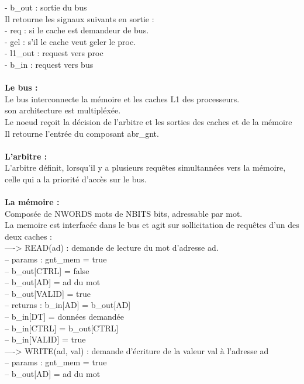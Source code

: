 \documentclass{article}
\begin{document}
- b\_out : sortie du bus\\
Il retourne les signaux suivants en sortie :\\
- req : si le cache est demandeur de bus.\\
- gel : s'il le cache veut geler le proc.\\
- l1\_out : request vers proc\\
- b\_in : request vers bus\\
\\
\textbf{Le bus :}\\
Le bus interconnecte la mémoire et les caches L1 des processeurs.\\
son architecture est multipléxée.\\
Le noeud reçoit la décision de l'arbitre et les sorties des caches et de la mémoire\\
Il retourne l'entrée du composant abr\_gnt.\\
\\
\textbf{L'arbitre :}\\
L'arbitre définit, lorsqu'il y a plusieurs requêtes simultannées vers la mémoire, celle qui a la priorité d'accès sur le bus.\\
\\
\textbf{La mémoire :}\\
Composée de NWORDS mots de NBITS bits, adressable par mot.\\
La memoire est interfacée dans le bus et agit sur sollicitation de requêtes d'un des deux caches : \\
----> READ(ad) : demande de lecture du mot d'adresse ad.\\
--    params   : gnt\_mem      = true\\
--               b\_out[CTRL]  = false\\
--               b\_out[AD]    = ad du mot\\
--               b\_out[VALID] = true\\
--    returns  : b\_in[AD]    = b\_out[AD]\\
--               b\_in[DT]    = données demandée\\
--               b\_in[CTRL]  = b\_out[CTRL]\\
--               b\_in[VALID] = true\\
----> WRITE(ad, val) : demande d'écriture de la valeur val à l'adresse ad\\
--    params   : gnt\_mem      = true\\
--               b\_out[AD]    = ad du mot\\
\end{document}
